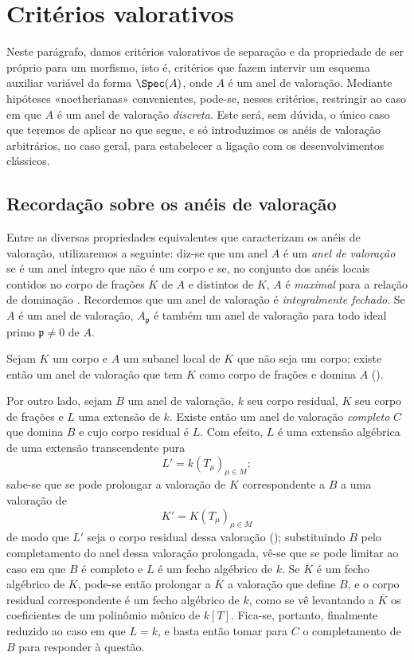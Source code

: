 \documentclass[oneside,10pt]{amsart}
\newcommand{\oldpage}[2][]{\marginnote{\normalfont\footnotesize\textbf{#1}~|~#2}\ignorespaces}
\let\EGAOriginalLabel\label
\renewcommand{\label}[1]{\phantomsection\EGAOriginalLabel{#1}}
\begin{document}
\section{Critérios valorativos}
\label{section:II.7}

Neste parágrafo, damos critérios valorativos de separação e da propriedade de ser próprio para um morfismo, isto é, critérios que fazem intervir um esquema auxiliar variável da forma $\Spec(A)$, onde $A$ é um anel de valoração.
Mediante hipóteses «noetherianas» convenientes, pode-se, nesses critérios, restringir ao caso em que $A$ é um anel de valoração \emph{discreta}.
Este será, sem dúvida, o único caso que teremos de aplicar no que segue, e só introduzimos os anéis de valoração arbitrários, no caso geral, para estabelecer a ligação com os desenvolvimentos clássicos.

\subsection{Recordação sobre os anéis de valoração}
\label{subsection:II.7.1}

\begin{env}[7.1.1]
\label{II.7.1.1}
Entre as diversas propriedades equivalentes que caracterizam os anéis de valoração, utilizaremos a seguinte:
diz-se que um anel $A$ é um \emph{anel de valoração} se é um anel íntegro que não é um corpo e se, no conjunto dos anéis locais contidos no corpo de frações $K$ de $A$ e distintos de $K$, $A$ é \emph{maximal} para a relação de dominação .
Recordemos que um anel de valoração é \emph{integralmente fechado}.
Se $A$ é um anel de valoração, $A_\mathfrak{p}$ é também um anel de valoração para todo ideal primo $\mathfrak{p}\neq0$ de $A$.
\end{env}

\begin{env}[7.1.2]
\label{II.7.1.2}
Sejam $K$ um corpo e $A$ um subanel local de $K$ que não seja um corpo;
\oldpage[II]{139}
existe então um anel de valoração que tem $K$ como corpo de frações e domina $A$ (\cite[p.~1-07, lema~2]{I-1}).

Por outro lado, sejam $B$ um anel de valoração, $k$ seu corpo residual, $K$ seu corpo de frações e $L$ uma extensão de $k$.
Existe então um anel de valoração \emph{completo} $C$ que domina $B$ e cujo corpo residual é $L$.
Com efeito, $L$ é uma extensão algébrica de uma extensão transcendente pura
\[
  L'=k(T_\mu)_{\mu\in M};
\]
sabe-se que se pode prolongar a valoração de $K$ correspondente a $B$ a uma valoração de
\[
  K'=K(T_\mu)_{\mu\in M}
\]
de modo que $L'$ seja o corpo residual dessa valoração (\cite[p.~98]{II-24});
substituindo $B$ pelo completamento do anel dessa valoração prolongada, vê-se que se pode limitar ao caso em que $B$ é completo e $L$ é um fecho algébrico de $k$.
Se $\overline{K}$ é um fecho algébrico de $K$, pode-se então prolongar a $\overline{K}$ a valoração que define $B$, e o corpo residual correspondente é um fecho algébrico de $k$, como se vê levantando a $\overline{K}$ os coeficientes de um polinômio mônico de $k[T]$.
Fica-se, portanto, finalmente reduzido ao caso em que $L=k$, e basta então tomar para $C$ o completamento de $B$ para responder à questão.
\end{env}
\end{document}
